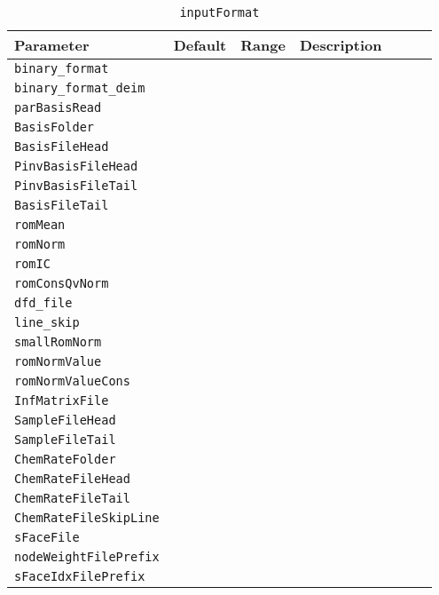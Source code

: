 \begin{table}[H]
    \centering
    \begin{tabular}{p{0.25\linewidth} p{0.1\linewidth} p{0.1\linewidth} p{0.5\linewidth}}
        \toprule
        Parameter & Default & Range & Description \\
        \midrule
        \verb|binary_format| &  &  &  \\
        \verb|binary_format_deim| &  &  &  \\
        \verb|parBasisRead| &  &  &  \\
        \verb|BasisFolder| &  &  &  \\
        \verb|BasisFileHead| &  &  &  \\
        \verb|PinvBasisFileHead| &  &  &  \\
        \verb|PinvBasisFileTail| &  &  &  \\
        \verb|BasisFileTail| &  &  &  \\
        \verb|romMean| &  &  &  \\
        \verb|romNorm| &  &  &  \\
        \verb|romIC| &  &  &  \\
        \verb|romConsQvNorm| &  &  &  \\
        \verb|dfd_file| &  &  &  \\
        \verb|line_skip| &  &  &  \\
        \verb|smallRomNorm| &  &  &  \\
        \verb|romNormValue| &  &  &  \\
        \verb|romNormValueCons| &  &  &  \\
        \verb|InfMatrixFile| &  &  &  \\
        \verb|SampleFileHead| &  &  &  \\
        \verb|SampleFileTail| &  &  &  \\
        \verb|ChemRateFolder| &  &  &  \\
        \verb|ChemRateFileHead| &  &  &  \\
        \verb|ChemRateFileTail| &  &  &  \\
        \verb|ChemRateFileSkipLine| &  &  &  \\
        \verb|sFaceFile| &  &  &  \\
        \verb|nodeWeightFilePrefix| &  &  &  \\
        \verb|sFaceIdxFilePrefix| &  &  &  \\
        \bottomrule
    \end{tabular}
    \caption{\texttt{inputFormat}}
\end{table}


